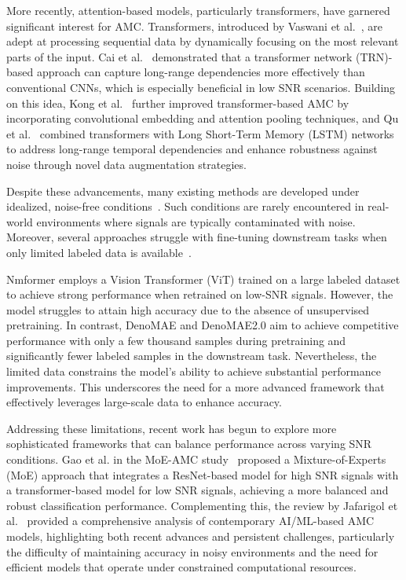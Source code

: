 More recently, attention-based models, particularly transformers, have garnered significant interest for AMC. Transformers, introduced by Vaswani et al.~\cite{vaswani2017attention}, are adept at processing sequential data by dynamically focusing on the most relevant parts of the input. Cai et al.~\cite{cai2022signal} demonstrated that a transformer network (TRN)-based approach can capture long-range dependencies more effectively than conventional CNNs, which is especially beneficial in low SNR scenarios. Building on this idea, Kong et al.~\cite{kong2023transformer} further improved transformer-based AMC by incorporating convolutional embedding and attention pooling techniques, and Qu et al.~\cite{qu2024enhancing} combined transformers with Long Short-Term Memory (LSTM) networks to address long-range temporal dependencies and enhance robustness against noise through novel data augmentation strategies.

Despite these advancements, many existing methods are developed under idealized, noise-free conditions~\cite{peng2018modulation,8454504}. Such conditions are rarely encountered in real-world environments where signals are typically contaminated with noise. Moreover, several approaches struggle with fine-tuning downstream tasks when only limited labeled data is available~\cite{hong2017automatic,ramjee2019fast}.

Nmformer \cite{faysal2024nmformer} employs a Vision Transformer (ViT) trained on a large labeled dataset to achieve strong performance when retrained on low-SNR signals. However, the model struggles to attain high accuracy due to the absence of unsupervised pretraining. In contrast, DenoMAE \cite{faysal2025denomae} and DenoMAE2.0 \cite{faysal2025denomae20improvingdenoisingmasked} aim to achieve competitive performance with only a few thousand samples during pretraining and significantly fewer labeled samples in the downstream task. Nevertheless, the limited data constrains the model's ability to achieve substantial performance improvements. This underscores the need for a more advanced framework that effectively leverages large-scale data to enhance accuracy.

Addressing these limitations, recent work has begun to explore more sophisticated frameworks that can balance performance across varying SNR conditions. Gao et al. in the MoE-AMC study~\cite{gao2023moe} proposed a Mixture-of-Experts (MoE) approach that integrates a ResNet-based model for high SNR signals with a transformer-based model for low SNR signals, achieving a more balanced and robust classification performance. Complementing this, the review by Jafarigol et al.~\cite{jafarigol2025ai} provided a comprehensive analysis of contemporary AI/ML-based AMC models, highlighting both recent advances and persistent challenges, particularly the difficulty of maintaining accuracy in noisy environments and the need for efficient models that operate under constrained computational resources.

